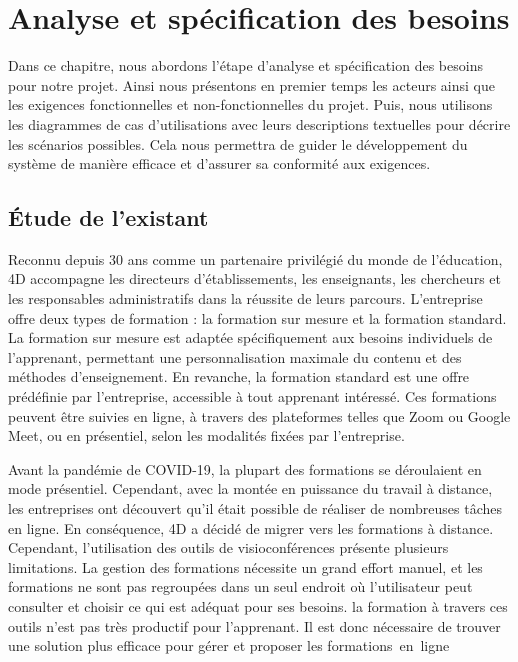 
\chapter{Analyse et spécification des besoins}
\label{chap:Analyse et spécification des besoins}



Dans ce chapitre, nous abordons l’étape d’analyse et spécification des besoins pour notre projet. Ainsi nous présentons en premier temps les acteurs ainsi que les exigences fonctionnelles et non-fonctionnelles du projet. Puis, nous utilisons les diagrammes de cas d’utilisations avec leurs descriptions textuelles pour décrire les scénarios possibles. Cela nous permettra de guider le développement du système de manière efficace et d’assurer sa conformité aux exigences.

\pagebreak

\section{Étude de l’existant}

Reconnu depuis 30 ans comme un partenaire privilégié du monde de l'éducation, 4D accompagne les directeurs d'établissements, les enseignants, les chercheurs et les responsables administratifs dans la réussite de leurs parcours. L'entreprise offre deux types de formation : la formation sur mesure et la formation standard. La formation sur mesure est adaptée spécifiquement aux besoins individuels de l'apprenant, permettant une personnalisation maximale du contenu et des méthodes d'enseignement. En revanche, la formation standard est une offre prédéfinie par l'entreprise, accessible à tout apprenant intéressé. Ces formations peuvent être suivies en ligne, à travers des plateformes telles que Zoom ou Google Meet, ou en présentiel, selon les modalités fixées par l'entreprise.

Avant la pandémie de COVID-19, la plupart des formations se déroulaient en mode présentiel. Cependant, avec la montée en puissance du travail à distance, les entreprises ont découvert qu'il était possible de réaliser de nombreuses tâches en ligne. En conséquence, 4D a décidé de migrer vers les formations à distance. Cependant, l'utilisation des outils de visioconférences présente plusieurs limitations. La gestion des formations nécessite un grand effort manuel, et les formations ne sont pas regroupées dans un seul endroit où l'utilisateur peut consulter et choisir ce qui est adéquat pour ses besoins. la formation à travers ces outils n'est pas très productif pour l'apprenant. Il est donc nécessaire de trouver une solution plus efficace pour gérer et proposer les formations en ligne

